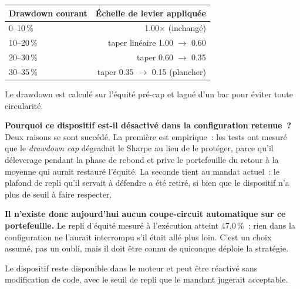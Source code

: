 \begin{center}
\renewcommand{\arraystretch}{1.1}
\begin{tabular}{lr}
\toprule
\textbf{Drawdown courant} & \textbf{Échelle de levier appliquée} \\
\midrule
0--10\,\% & 1.00$\times$ (inchangé) \\
10--20\,\% & taper linéaire 1.00 $\rightarrow$ 0.60 \\
20--30\,\% & taper 0.60 $\rightarrow$ 0.35 \\
30--35\,\% & taper 0.35 $\rightarrow$ 0.15 (plancher) \\
\bottomrule
\end{tabular}
\end{center}

Le drawdown est calculé sur l'équité pré-cap et lagué d'un bar pour éviter toute circularité.

\begin{warningbox}
\textbf{Pourquoi ce dispositif est-il désactivé dans la configuration retenue~?} Deux raisons se sont succédé. La première est empirique~: les tests ont mesuré que le \emph{drawdown cap} dégradait le Sharpe au lieu de le protéger, parce qu'il déleverage pendant la phase de rebond et prive le portefeuille du retour à la moyenne qui aurait restauré l'équité. La seconde tient au mandat actuel~: le plafond de repli qu'il servait à défendre a été retiré, si bien que le dispositif n'a plus de seuil à faire respecter.

\textbf{Il n'existe donc aujourd'hui aucun coupe-circuit automatique sur ce portefeuille.} Le repli d'équité mesuré à l'exécution atteint 47,0\,\%~; rien dans la configuration ne l'aurait interrompu s'il était allé plus loin. C'est un choix assumé, pas un oubli, mais il doit être connu de quiconque déploie la stratégie.
\end{warningbox}

Le dispositif reste disponible dans le moteur et peut être réactivé sans modification de code, avec le seuil de repli que le mandant jugerait acceptable.
